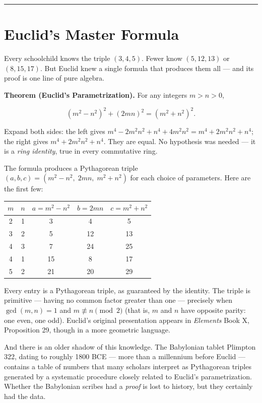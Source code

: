 \documentclass[12pt, letterpaper, openany]{book}
\theoremstyle{definition}
\theoremstyle{remark}
\begin{document}
\bigskip\noindent\rule{\textwidth}{0.4pt}\bigskip



\section*{Euclid's Master Formula}


Every schoolchild knows the triple $(3, 4, 5)$. Fewer know $(5, 12, 13)$ or $(8, 15, 17)$. But Euclid knew a single formula that produces them all --- and its proof is one line of pure algebra.

\textbf{Theorem (Euclid's Parametrization).} For any integers $m > n > 0$,

\[
(m^2 - n^2)^2 + (2mn)^2 = (m^2 + n^2)^2.
\]

Expand both sides: the left gives $m^4 - 2m^2 n^2 + n^4 + 4m^2 n^2 = m^4 + 2m^2 n^2 + n^4$; the right gives $m^4 + 2m^2 n^2 + n^4$. They are equal. No hypothesis was needed --- it is a \textit{ring identity}, true in every commutative ring.

The formula produces a Pythagorean triple $(a, b, c) = (m^2 - n^2, \; 2mn, \; m^2 + n^2)$ for each choice of parameters. Here are the first few:


\begin{center}
\begin{tabular}{|c|c|c|c|c|}
\hline
$m$ & $n$ & $a = m^2 - n^2$ & $b = 2mn$ & $c = m^2 + n^2$ \\
\hline
2 & 1 & 3 & 4 & 5 \\
3 & 2 & 5 & 12 & 13 \\
4 & 3 & 7 & 24 & 25 \\
4 & 1 & 15 & 8 & 17 \\
5 & 2 & 21 & 20 & 29 \\
\hline
\end{tabular}
\end{center}


Every entry is a Pythagorean triple, as guaranteed by the identity. The triple is primitive --- having no common factor greater than one --- precisely when $\gcd(m, n) = 1$ and $m \not\equiv n \pmod{2}$ (that is, $m$ and $n$ have opposite parity: one even, one odd). Euclid's original presentation appears in \textit{Elements} Book X, Proposition 29, though in a more geometric language.

And there is an older shadow of this knowledge. The Babylonian tablet Plimpton 322, dating to roughly 1800 BCE --- more than a millennium before Euclid --- contains a table of numbers that many scholars interpret as Pythagorean triples generated by a systematic procedure closely related to Euclid's parametrization. Whether the Babylonian scribes had a \textit{proof} is lost to history, but they certainly had the data.
\end{document}
